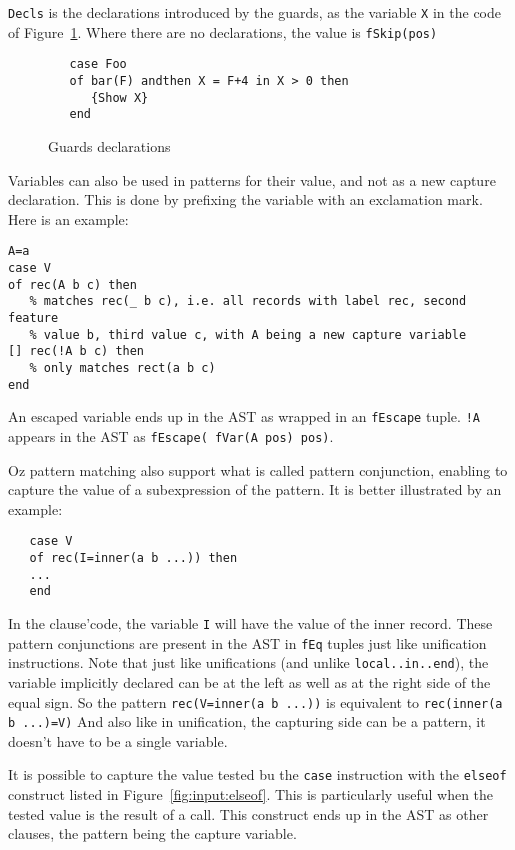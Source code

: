 \documentclass[a4paper]{memoir}
\begin{document}
\lstinline!Decls! is the declarations introduced by the guards, as the variable \lstinline!X! in the code of Figure~\ref{fig:guardsdecls}.
Where there are no declarations, the value is \lstinline!fSkip(pos)!

\begin{figure}[h]
\begin{lstlisting}
   case Foo
   of bar(F) andthen X = F+4 in X > 0 then 
      {Show X}
   end
\end{lstlisting}
\caption{Guards declarations}
\label{fig:guardsdecls}
\end{figure}


Variables can also be used in patterns for their value, and not as a new capture
declaration. This is done by prefixing the variable with an exclamation mark.
Here is an example:

\begin{lstlisting}
A=a
case V
of rec(A b c) then
   % matches rec(_ b c), i.e. all records with label rec, second feature 
   % value b, third value c, with A being a new capture variable
[] rec(!A b c) then
   % only matches rect(a b c)
end
\end{lstlisting}

An escaped variable ends up in the AST as wrapped in an \lstinline!fEscape!
tuple. \lstinline$!A$ appears in the AST as \lstinline!fEscape( fVar(A pos) pos)!.

Oz pattern matching also support what is called pattern conjunction, enabling to
capture the value of a subexpression of the pattern. It is better
illustrated by an example:
\begin{lstlisting}
   case V 
   of rec(I=inner(a b ...)) then
   ...
   end
\end{lstlisting}

In the clause'code, the variable \lstinline!I! will have the value of the inner record.
These pattern conjunctions are present in the AST in \lstinline!fEq! tuples just 
like unification instructions.
Note that just like unifications (and unlike \lstinline!local..in..end!), the variable implicitly declared can be at the
left as well as at the right side of the equal sign. So the pattern
\lstinline!rec(V=inner(a b ...))! is equivalent to \lstinline!rec(inner(a b ...)=V)!
And also like in unification, the capturing side can be a pattern, it doesn't
have to be a single variable.

It is possible to capture the value tested bu the \lstinline!case! instruction with the \lstinline!elseof! construct listed in 
Figure~\ref{fig:input:elseof}. This is particularly useful when the tested value is the result of a call. This construct ends up in the 
AST as other clauses, the pattern being the capture variable.
\end{document}
